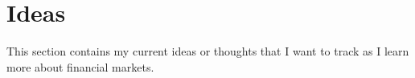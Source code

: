 \section{Ideas}

This section contains my current ideas or thoughts that I want to track as I learn more about financial markets.


